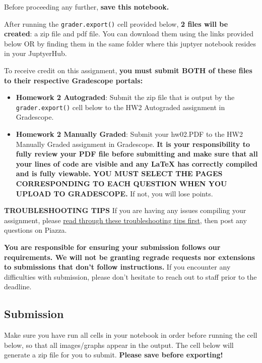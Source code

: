 \documentclass[11pt]{article}
\begin{document}
Before proceeding any further, \textbf{save this notebook.}

After running the \texttt{grader.export()} cell provided below,
\textbf{2 files will be created}: a zip file and pdf file. You can
download them using the links provided below OR by finding them in the
same folder where this juptyer notebook resides in your JuptyerHub.

To receive credit on this assignment, \textbf{you must submit BOTH of
these files to their respective Gradescope portals:}

\begin{itemize}
\item
  \textbf{Homework 2 Autograded}: Submit the zip file that is output by
  the \texttt{grader.export()} cell below to the HW2 Autograded
  assignment in Gradescope.
\item
  \textbf{Homework 2 Manually Graded}: Submit your hw02.PDF to the HW2
  Manually Graded assignment in Gradescope. \textbf{It is your
  responsibility to fully review your PDF file before submitting and
  make sure that all your lines of code are visible and any LaTeX has
  correctly compiled and is fully viewable.} \textbf{YOU MUST SELECT THE
  PAGES CORRESPONDING TO EACH QUESTION WHEN YOU UPLOAD TO GRADESCOPE.}
  If not, you will lose points.
\end{itemize}

\textbf{TROUBLESHOOTING TIPS} If you are having any issues compiling
your assignment, please
\href{https://docs.google.com/document/d/1ndr3Wj1PSF5qzlLMaBJznwh6QGeEXjd5TAJ6nf9EJvo/edit?usp=sharing}{read
through these troubleshooting tips first}, then post any questions on
Piazza.

\textbf{You are responsible for ensuring your submission follows our
requirements. We will not be granting regrade requests nor extensions to
submissions that don't follow instructions.} If you encounter any
difficulties with submission, please don't hesitate to reach out to
staff prior to the deadline.

    \subsection{Submission}\label{submission}

Make sure you have run all cells in your notebook in order before
running the cell below, so that all images/graphs appear in the output.
The cell below will generate a zip file for you to submit.
\textbf{Please save before exporting!}
\end{document}
